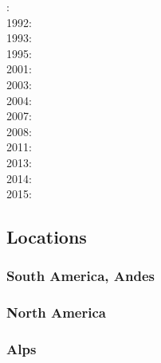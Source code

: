 : \cite{brpo81}\\
1992: \cite{vayv92}\cite{zaju92}\cite{wein92}\cite{wesc92}\cite{veja92}\\
1993: \cite{kesb93}\cite{nabr93}\cite{potp93}\cite{povp93}\cite{vasv93}\cite{pocp93}\cite{popt93}\cite{wein93}\\
1995: \cite{wepo95}\cite{bisc95}\cite{wepo95}\\
2001: \cite{kapo01}\\
2003: \cite{geur03}\cite{vavs03}\\
2004: \cite{gepm04}\cite{istt04}\cite{geur04}\\
2007: \cite{gebu07}\\
2008: \cite{buge08}\cite{zlfd08}\\
2011: \cite{ellw11}\cite{pege11}\\
2013: \cite{fusc13}\\
2014: \cite{feka14b}\\
2015: \cite{feka15}\cite{fuks15}


\subsection*{Locations}


\subsubsection*{South America, Andes} 

\cite{wdbo94b}
\cite{basv06}
\cite{robn16}

\subsubsection*{North America} 

\cite{bugm97}

\subsubsection*{Alps} 

